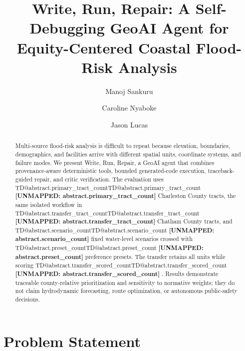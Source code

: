 \documentclass[sigconf,nonacm]{acmart}
\makeatletter
\newcommand{\TD}[1]{%
  \ifcsname TD@#1\endcsname\csname TD@#1\endcsname%
  \else\textbf{[UNMAPPED: #1]}\fi%
}
\makeatother
\begin{document}
\title{Write, Run, Repair: A Self-Debugging GeoAI Agent for Equity-Centered Coastal Flood-Risk Analysis}

\author{Manoj Sankuru}

\author{Caroline Nyaboke}

\author{Jason Lucas}

\begin{abstract}
Multi-source flood-risk analysis is difficult to repeat because elevation,
boundaries, demographics, and facilities arrive with different spatial units,
coordinate systems, and failure modes. We present Write, Run, Repair, a GeoAI
agent that combines provenance-aware deterministic tools, bounded generated-code
execution, traceback-guided repair, and critic verification. The evaluation uses
\TD{abstract.primary_tract_count} Charleston County tracts, the same isolated
workflow in \TD{abstract.transfer_tract_count} Chatham County tracts, and
\TD{abstract.scenario_count} fixed water-level scenarios crossed with
\TD{abstract.preset_count} preference presets. The transfer retains all units
while scoring \TD{abstract.transfer_scored_count}. Results demonstrate
traceable county-relative prioritization and sensitivity to normative weights;
they do not claim hydrodynamic forecasting, route optimization, or autonomous
public-safety decisions.
\end{abstract}


\maketitle

\section{Problem Statement}
\end{document}
